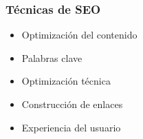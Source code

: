 \documentclass[
10pt, %
aspectratio=169, %
]{beamer}
\begin{document}
	\begin{frame}
		
		\frametitle{Técnicas de SEO}
		
		\begin{itemize}
			\item Optimización del contenido \\[2mm]
			
			\item Palabras clave \\[2mm]
			
			\item Optimización técnica \\[2mm]
			
			\item Construcción de enlaces \\[2mm]
			
			\item Experiencia del usuario
			
		\end{itemize}
		
		
	\end{frame}
	
\end{document}
